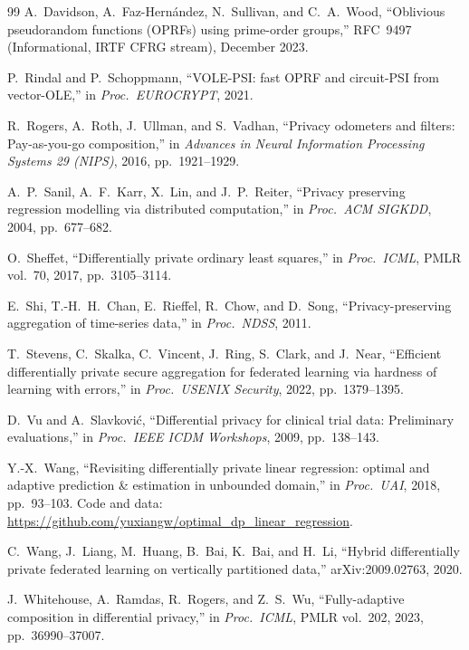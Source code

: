 \documentclass[11pt]{article}
\theoremstyle{definition}
\theoremstyle{plain}
\begin{document}
\begin{thebibliography}{99}
A.~Davidson, A.~Faz-Hern\'andez, N.~Sullivan, and C.~A.~Wood,
``Oblivious pseudorandom functions (OPRFs) using prime-order groups,''
RFC~9497 (Informational, IRTF CFRG stream), December 2023.

P.~Rindal and P.~Schoppmann,
``VOLE-PSI: fast OPRF and circuit-PSI from vector-OLE,''
in \textit{Proc.\ EUROCRYPT}, 2021.

R.~Rogers, A.~Roth, J.~Ullman, and S.~Vadhan,
``Privacy odometers and filters: Pay-as-you-go composition,''
in \textit{Advances in Neural Information Processing Systems 29 (NIPS)}, 2016, pp.\ 1921--1929.

A.~P.~Sanil, A.~F.~Karr, X.~Lin, and J.~P.~Reiter,
``Privacy preserving regression modelling via distributed computation,''
in \textit{Proc.\ ACM SIGKDD}, 2004, pp.\ 677--682.

O.~Sheffet,
``Differentially private ordinary least squares,''
in \textit{Proc.\ ICML}, PMLR vol.~70, 2017, pp.\ 3105--3114.

E.~Shi, T.-H.~H.~Chan, E.~Rieffel, R.~Chow, and D.~Song,
``Privacy-preserving aggregation of time-series data,''
in \textit{Proc.\ NDSS}, 2011.

T.~Stevens, C.~Skalka, C.~Vincent, J.~Ring, S.~Clark, and J.~Near,
``Efficient differentially private secure aggregation for federated learning via hardness of learning with errors,''
in \textit{Proc.\ USENIX Security}, 2022, pp.\ 1379--1395.

D.~Vu and A.~Slavkovi\'c,
``Differential privacy for clinical trial data: Preliminary evaluations,''
in \textit{Proc.\ IEEE ICDM Workshops}, 2009, pp.\ 138--143.

Y.-X.~Wang,
``Revisiting differentially private linear regression: optimal and adaptive prediction \& estimation in unbounded domain,''
in \textit{Proc.\ UAI}, 2018, pp.\ 93--103.
Code and data: \url{https://github.com/yuxiangw/optimal_dp_linear_regression}.

C.~Wang, J.~Liang, M.~Huang, B.~Bai, K.~Bai, and H.~Li,
``Hybrid differentially private federated learning on vertically partitioned data,''
arXiv:2009.02763, 2020.

J.~Whitehouse, A.~Ramdas, R.~Rogers, and Z.~S.~Wu,
``Fully-adaptive composition in differential privacy,''
in \textit{Proc.\ ICML}, PMLR vol.~202, 2023, pp.\ 36990--37007.


\end{thebibliography}
\end{document}
